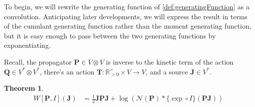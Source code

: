 \documentclass[12pt]{article}
\theoremstyle{definition}
\theoremstyle{plain}
\newtheorem{thm}{Theorem}
\begin{document}
To begin, we will rewrite the generating function of \autoref{def:generatingFunction} as a convolution.  Anticipating later developments, we will express the result in terms of the cumulant generating function rather than the moment generating function, but it is easy enough to pass between the two generating functions by exponentiating.

Recall, the propagator $\mathbf{P}\in V\otimes V$ is inverse to the kinetic term of the action $\mathbf{Q}\in V^*\otimes V^*$, there's an action $\mathbf{T} : \mathbb{R}^\times_{>0} \times V \to V$, and a source $\mathbf{J}\in V^*$.\\

\begin{thm} \label{GenAsConvo}
  \begin{align}
    W[\mathbf{P}, I](\mathbf{J})
    &= \tfrac{1}{2} \mathbf{J}\mathbf{P}\mathbf{J}  +
    \log (\mathcal{N}(\mathbf{P}) * \{\exp \circ I\} (\mathbf{P}\mathbf{J}))
  \end{align}
\end{thm}
\end{document}
